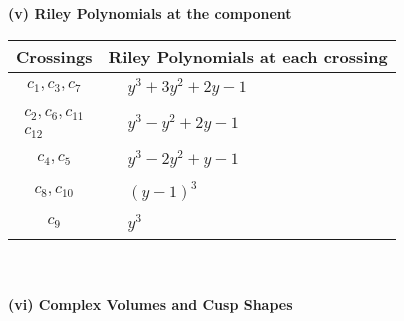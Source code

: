 \documentclass[1p]{elsarticle_modified}
\theoremstyle{definition}
\begin{document}
\newpage\renewcommand{\arraystretch}{1}
\flushleft \textbf{(v) Riley Polynomials at the component}\newline \\
\begin{tabular}{m{50pt}|m{274pt}}
Crossings & \hspace{64pt}Riley Polynomials at each crossing \\
\hline $$\begin{aligned}c_{1},c_{3},c_{7}\end{aligned}$$&$\begin{aligned}
&y^3+3 y^2+2 y-1
\end{aligned}$\\
\hline $$\begin{aligned}c_{2},c_{6},c_{11}\\c_{12}\end{aligned}$$&$\begin{aligned}
&y^3- y^2+2 y-1
\end{aligned}$\\
\hline $$\begin{aligned}c_{4},c_{5}\end{aligned}$$&$\begin{aligned}
&y^3-2 y^2+y-1
\end{aligned}$\\
\hline $$\begin{aligned}c_{8},c_{10}\end{aligned}$$&$\begin{aligned}
&(y-1)^3
\end{aligned}$\\
\hline $$\begin{aligned}c_{9}\end{aligned}$$&$\begin{aligned}
&y^3
\end{aligned}$\\
\hline
\end{tabular}\\~\\
\newpage\flushleft \textbf{(vi) Complex Volumes and Cusp Shapes}
\end{document}
